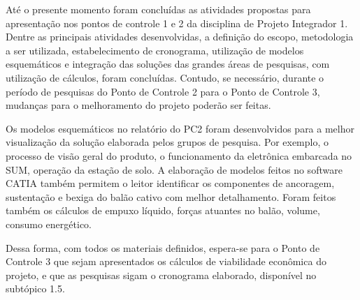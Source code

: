 Até o presente momento foram concluídas as atividades propostas para apresentação nos pontos de controle 1 e 2 da disciplina de Projeto Integrador 1. Dentre as principais atividades desenvolvidas, a definição do escopo, metodologia a ser utilizada, estabelecimento de cronograma, utilização de modelos esquemáticos e integração das soluções das grandes áreas de pesquisas, com utilização de cálculos, foram concluídas. Contudo, se necessário, durante o período de pesquisas do Ponto de Controle 2 para o Ponto de Controle 3, mudanças para o melhoramento do projeto poderão ser feitas.

Os modelos esquemáticos no relatório do PC2 foram desenvolvidos para a melhor visualização da solução elaborada pelos grupos de pesquisa. Por exemplo, o processo de visão geral do produto, o funcionamento da eletrônica embarcada no SUM,  operação da estação de solo. A elaboração de modelos feitos no software CATIA também permitem o leitor identificar os componentes de ancoragem, sustentação e bexiga do balão cativo com melhor detalhamento. Foram feitos também os cálculos de empuxo líquido, forças atuantes no balão, volume, consumo energético.

Dessa forma, com todos os materiais definidos, espera-se para o Ponto de Controle 3 que sejam apresentados os cálculos de viabilidade econômica do projeto, e que as pesquisas sigam o cronograma elaborado, disponível no subtópico 1.5.
